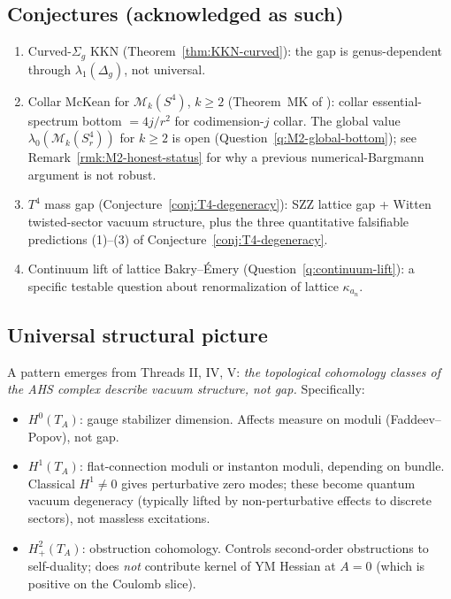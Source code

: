 \documentclass[11pt,letterpaper]{article}
\theoremstyle{definition}
\newcommand{\cM}{\mathcal{M}}
\begin{document}
\subsection{Conjectures (acknowledged as such)}

\begin{enumerate}[label=(C\arabic*),leftmargin=2.5em]
\item Curved-$\Sigma_g$ KKN (Theorem~\ref{thm:KKN-curved}): the gap is genus-dependent through $\lambda_1(\Delta_g)$, not universal.

\item Collar McKean for $\cM_k(S^4)$, $k\ge 2$ (Theorem~MK of \cite{bonfioli-core}): collar essential-spectrum bottom $= 4j/r^2$ for codimension-$j$ collar. The global value $\lambda_0(\cM_k(S^4_r))$ for $k \ge 2$ is open (Question~\ref{q:M2-global-bottom}); see Remark~\ref{rmk:M2-honest-status} for why a previous numerical-Bargmann argument is not robust.

\item $T^4$ mass gap (Conjecture~\ref{conj:T4-degeneracy}): SZZ lattice gap + Witten twisted-sector vacuum structure, plus the three quantitative falsifiable predictions (1)--(3) of Conjecture~\ref{conj:T4-degeneracy}.

\item Continuum lift of lattice Bakry--\'Emery (Question~\ref{q:continuum-lift}): a specific testable question about renormalization of lattice $\kappa_{a_n}$.
\end{enumerate}

\subsection{Universal structural picture}

A pattern emerges from Threads II, IV, V: \emph{the topological cohomology classes of the AHS complex describe vacuum structure, not gap.} Specifically:
\begin{itemize}
\item $H^0(T_A)$: gauge stabilizer dimension. Affects measure on moduli (Faddeev--Popov), not gap.
\item $H^1(T_A)$: flat-connection moduli or instanton moduli, depending on bundle. Classical $H^1 \ne 0$ gives perturbative zero modes; these become quantum vacuum degeneracy (typically lifted by non-perturbative effects to discrete sectors), not massless excitations.
\item $H^2_+(T_A)$: obstruction cohomology. Controls second-order obstructions to self-duality; does \emph{not} contribute kernel of YM Hessian at $A=0$ (which is positive on the Coulomb slice).
\end{itemize}
\end{document}

